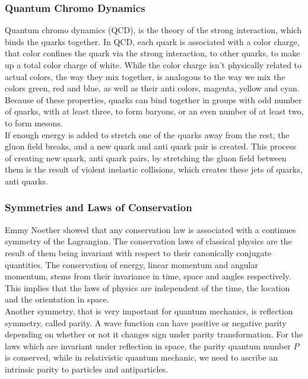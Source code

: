 \documentclass[11pt,a4paper]{article}
\begin{document}
\subsubsection{Quantum Chromo Dynamics}
Quantum chromo dynamics (QCD), is the theory of the strong interaction, which
binds the quarks together. In QCD, each quark is associated with a color charge,
that color confines the quark via the strong interaction, to other quarks, to
make up a total color charge of white. While the color charge isn't physically
related to actual colors, the way they mix together, is analogous to the way we
mix the colors green, red and blue, as well as their anti colors, magenta,
yellow and cyan. Because of these properties, quarks can bind together in groups
with odd number of quarks, with at least three, to form baryons, or an even
number of at least two, to form mesons.\\

If enough energy is added to stretch one of the quarks away from the rest, the
gluon field breaks, and a new quark and anti quark pair is created. This process
of creating new quark, anti quark pairs, by stretching the gluon field between
them is the result of violent inelastic collisions, which creates these jets of
quarks, anti quarks.

\subsubsection{Symmetries and Laws of Conservation} Emmy Noether showed that any
conservation law is associated with a continues symmetry of the Lagrangian. The
conservation laws of classical physics are the result of them being invariant
with respect to their canonically conjugate quantities. The conservation of
energy, linear momentum and angular momentum, stems from their invariance in
time, space and angles respectively. This implies that the laws of physics are
independent of the time, the location and the orientation in space.\\

Another symmetry, that is very important for quantum mechanics, is reflection
symmetry, called parity. A wave function can have positive or negative parity
depending on whether or not it changes sign under parity transformation. For the
laws which are invariant under reflection in space, the parity quantum number
$P$ is conserved, while in relativistic quantum mechanic, we need to ascribe an
intrinsic parity to particles and antiparticles.\\
\end{document}
